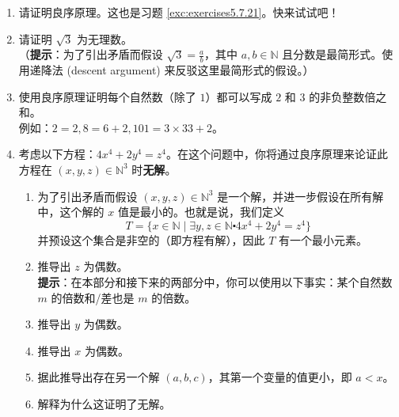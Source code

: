 \begin{enumerate}[label=(\arabic*)]
    \item 请证明良序原理。这也是习题 \ref{exc:exercises5.7.21}。快来试试吧！
    \item 请证明 $\sqrt{3}$ 为无理数。\\
        （\textbf{提示}：为了引出矛盾而假设 $\sqrt{3} = \frac{a}{b}$，其中 $a, b \in \mathbb{N}$ 且分数是最简形式。使用递降法 (descent argument) 来反驳这里最简形式的假设。）
    \item 使用良序原理证明每个自然数（除了 $1$）都可以写成 $2$ 和 $3$ 的非负整数倍之和。\\
        例如：$2 = 2, 8 = 6 + 2, 101 = 3 \times 33 + 2$。
    \item 考虑以下方程：$4x^4 + 2y^4 = z^4$。在这个问题中，你将通过良序原理来论证此方程在 $(x, y, z) \in \mathbb{N}^3$ 时\textbf{无解}。
        \begin{enumerate}[label=(\alph*)]
            \item 为了引出矛盾而假设 $(x, y, z) \in \mathbb{N}^3$ 是一个解，并进一步假设在所有解中，这个解的 $x$ 值是最小的。也就是说，我们定义
            \[T = \{x \in \mathbb{N} \mid \exists y, z \in \mathbb{N} \centerdot 4x^4 + 2y^4 = z^4\}\]
            并预设这个集合是非空的（即方程有解），因此 $T$ 有一个最小元素。
            \item 推导出 $z$ 为偶数。\\
            \textbf{提示}：在本部分和接下来的两部分中，你可以使用以下事实：某个自然数 $m$ 的倍数和/差也是 $m$ 的倍数。
            \item 推导出 $y$ 为偶数。
            \item 推导出 $x$ 为偶数。
            \item 据此推导出存在另一个解 $(a, b, c)$，其第一个变量的值更小，即 $a < x$。
            \item 解释为什么这证明了无解。
        \end{enumerate}
\end{enumerate}